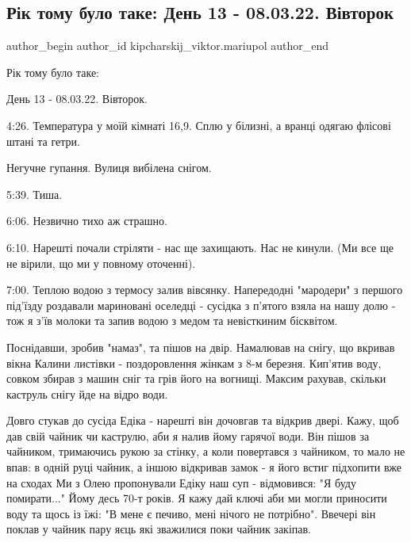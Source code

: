  
 
 
 
 

\subsection{Рік тому було таке:  День 13 - 08.03.22. Вівторок}
\label{sec:08_03_2023.fb.kipcharskij_viktor.mariupol.1.r_k_tomu_bulo_take__}

\ifcmt
 author_begin
   author_id kipcharskij_viktor.mariupol
 author_end
\fi

Рік тому було таке: 

День 13 - 08.03.22. Вівторок. 

4:26. Температура у моїй кімнаті 16,9. Сплю у білизні, а вранці одягаю флісові
штані та гетри.

Негучне гупання. Вулиця вибілена снігом.

5:39. Тиша.

6:06. Незвично тихо аж страшно.

6:10. Нарешті почали стріляти - нас ще захищають. Нас не кинули. (Ми все ще не
вірили, що ми у повному оточенні).

7:00. Теплою водою з термосу залив вівсянку. Напередодні "мародери" з першого
під'їзду роздавали мариновані оселедці - сусідка з п'ятого взяла на нашу долю -
тож я з'їв молоки та запив водою з медом та невісткиним бісквітом.

Поснідавши, зробив "намаз", та пішов на двір. Намалював на снігу, що вкривав
вікна Калини листівки - поздоровлення жінкам з 8-м березня. Кип'ятив воду,
совком збирав з машин сніг та грів його на вогнищі. Максим рахував, скільки
каструль снігу йде на відро води.

Довго стукав до сусіда Едіка - нарешті він дочовгав та відкрив двері. Кажу, щоб
дав свій  чайник чи каструлю, аби я налив йому гарячої води. Він пішов за
чайником, тримаючись рукою за стінку, а коли повертався з чайником, то мало не
впав: в одній руці чайник, а іншою відкривав замок - я його встиг підхопити вже
на сходах  Ми з Олею пропонували Едіку наш суп - відмовився: "Я буду
помирати..." Йому десь 70-т років. Я кажу дай ключі аби ми могли приносити воду
та щось із їжі: "В мене є печиво, мені нічого не потрібно". Ввечері він поклав
у чайник пару яєць які зважилися поки чайник закіпав.


